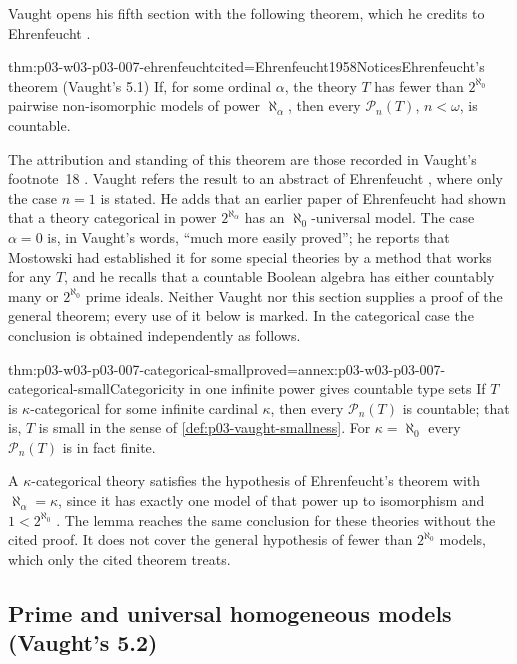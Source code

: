 Vaught opens his fifth section with the following theorem, which he
credits to Ehrenfeucht \cite[p.~315, 5.1]{Vaught1961}.

\begin{hbtheorem}{thm:p03-w03-p03-007-ehrenfeucht}{cited=Ehrenfeucht1958Notices}{Ehrenfeucht's theorem (Vaught's 5.1)}
If, for some ordinal \(\alpha\), the theory \(T\) has fewer than
\(2^{\aleph_0}\) pairwise non-isomorphic models of power \(\aleph_\alpha\),
then every \(\mathcal P_n(T)\), \(n<\omega\), is countable.
\end{hbtheorem}

The attribution and standing of this theorem are those recorded in Vaught's
footnote~18 \cite[p.~315, n.~18]{Vaught1961}. Vaught refers the result to
an abstract of Ehrenfeucht \cite{Ehrenfeucht1958Notices}, where only the
case \(n=1\) is stated. He adds that an earlier paper of Ehrenfeucht had
shown that a theory categorical in power \(2^{\aleph_\alpha}\) has an
\(\aleph_0\)-universal model. The case \(\alpha=0\) is, in Vaught's words,
``much more easily proved''; he reports that Mostowski had established it for
some special theories by a method that works for any \(T\), and he recalls
that a countable Boolean algebra has either countably many or
\(2^{\aleph_0}\) prime ideals. Neither Vaught nor this section supplies a
proof of the general theorem; every use of it below is marked. In the
categorical case the conclusion is obtained independently as follows.

\begin{hblemma}{thm:p03-w03-p03-007-categorical-small}{proved=annex:p03-w03-p03-007-categorical-small}{Categoricity in one infinite power gives countable type sets}
If \(T\) is \(\kappa\)-categorical for some infinite cardinal \(\kappa\),
then every \(\mathcal P_n(T)\) is countable; that is, \(T\) is small in the
sense of \cref{def:p03-vaught-smallness}. For \(\kappa=\aleph_0\) every
\(\mathcal P_n(T)\) is in fact finite.
\end{hblemma}

A \(\kappa\)-categorical theory satisfies the hypothesis of
Ehrenfeucht's theorem with \(\aleph_\alpha=\kappa\), since it has exactly one
model of that power up to isomorphism and \(1<2^{\aleph_0}\)
\cite[p.~316]{Vaught1961}. The lemma reaches the same conclusion for these
theories without the cited proof. It does not cover the general hypothesis
of fewer than \(2^{\aleph_0}\) models, which only the cited theorem treats.

\subsection{Prime and universal homogeneous models (Vaught's 5.2)}
\label{sec:p03-w03-p03-007-five-two}

